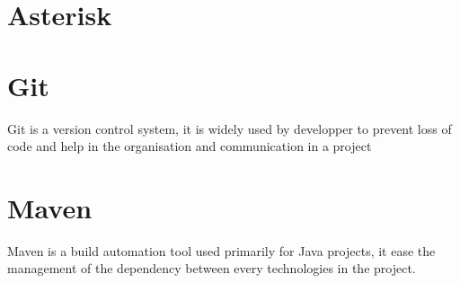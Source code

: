 \section{Asterisk}



\section{Git}

Git is a version control system, it is widely used by developper to prevent loss of code and help in the organisation and communication in a project


\section{Maven}

Maven is a build automation tool used primarily for Java projects, it ease the management of the dependency between every technologies in the project.


\newpage